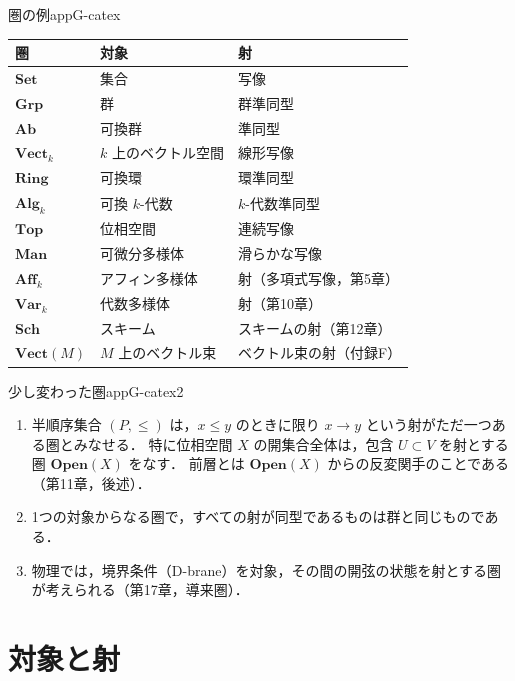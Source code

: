 \begin{myex}{圏の例}{appG-catex}
\begin{center}
\begin{tabular}{lll}
圏 & 対象 & 射\\ \hline
$\mathbf{Set}$ & 集合 & 写像\\
$\mathbf{Grp}$ & 群 & 群準同型\\
$\mathbf{Ab}$ & 可換群 & 準同型\\
$\mathbf{Vect}_k$ & $k$ 上のベクトル空間 & 線形写像\\
$\mathbf{Ring}$ & 可換環 & 環準同型\\
$\mathbf{Alg}_k$ & 可換 $k$-代数 & $k$-代数準同型\\
$\mathbf{Top}$ & 位相空間 & 連続写像\\
$\mathbf{Man}$ & 可微分多様体 & 滑らかな写像\\
$\mathbf{Aff}_k$ & アフィン多様体 & 射（多項式写像，第5章）\\
$\mathbf{Var}_k$ & 代数多様体 & 射（第10章）\\
$\mathbf{Sch}$ & スキーム & スキームの射（第12章）\\
$\mathbf{Vect}(M)$ & $M$ 上のベクトル束 & ベクトル束の射（付録F）
\end{tabular}
\end{center}
\end{myex}

\begin{myex}{少し変わった圏}{appG-catex2}
\begin{enumerate}
\item 半順序集合 $(P,\leq)$ は，$x\leq y$ のときに限り $x\to y$ という射がただ一つある圏とみなせる．
特に位相空間 $X$ の開集合全体は，包含 $U\subset V$ を射とする圏 $\mathbf{Open}(X)$ をなす．
前層とは $\mathbf{Open}(X)$ からの反変関手のことである（第11章，後述）．
\item 1つの対象からなる圏で，すべての射が同型であるものは群と同じものである．
\item 物理では，境界条件（D-brane）を対象，その間の開弦の状態を射とする圏が考えられる（第17章，導来圏）．
\end{enumerate}
\end{myex}

\section{対象と射}

